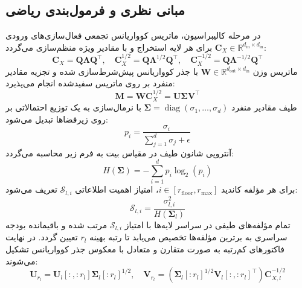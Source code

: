 \subsection{مبانی نظری و فرمول‌بندی ریاضی}
در مرحله کالیبراسیون، ماتریس کوواریانس تجمعی فعال‌سازی‌های ورودی $\mathbf{C}_X \in \mathbb{R}^{d_{\text{in}} \times d_{\text{in}}}$ برای هر لایه استخراج و با مقادیر ویژه منظم‌سازی می‌گردد:
\begin{equation}
\mathbf{C}_X = \mathbf{Q} \mathbf{\Lambda} \mathbf{Q}^\top, \quad \mathbf{C}_X^{1/2} = \mathbf{Q} \mathbf{\Lambda}^{1/2} \mathbf{Q}^\top, \quad \mathbf{C}_X^{-1/2} = \mathbf{Q} \mathbf{\Lambda}^{-1/2} \mathbf{Q}^\top
\end{equation}
ماتریس وزن $\mathbf{W} \in \mathbb{R}^{d_{\text{out}} \times d_{\text{in}}}$ با جذر کوواریانس پیش‌شرط‌سازی شده و تجزیه مقادیر منفرد بر روی ماتریس سفیدشده انجام می‌پذیرد:
\begin{equation}
\mathbf{M} = \mathbf{W} \mathbf{C}_X^{1/2} = \mathbf{U} \mathbf{\Sigma} \mathbf{V}^\top
\end{equation}
طیف مقادیر منفرد $\mathbf{\Sigma} = \operatorname{diag}(\sigma_1, \dots, \sigma_d)$ با نرمال‌سازی به یک توزیع احتمالاتی بر روی زیرفضاها تبدیل می‌شود:
\begin{equation}
p_i = \frac{\sigma_i}{\sum_{j=1}^d \sigma_j + \epsilon}
\end{equation}
آنتروپی شانون طیف در مقیاس بیت به فرم زیر محاسبه می‌گردد:
\begin{equation}
H(\mathbf{\Sigma}) = -\sum_{i=1}^d p_i \log_2(p_i)
\end{equation}
برای هر مؤلفه کاندید $i \in [r_{\text{floor}}, r_{\max}]$، امتیاز اهمیت اطلاعاتی $\mathcal{S}_{l, i}$ تعریف می‌شود:
\begin{equation}
\mathcal{S}_{l, i} = \frac{\sigma_{l, i}^2}{H(\mathbf{\Sigma}_l)}
\end{equation}
تمام مؤلفه‌های طیفی در سراسر لایه‌ها با امتیاز $\mathcal{S}_{l, i}$ مرتب شده و باقیمانده بودجه سراسری به برترین مؤلفه‌ها تخصیص می‌یابد تا رتبه بهینه $r_l$ تعیین گردد. در نهایت فاکتورهای کم‌رتبه به صورت متقارن و متعادل با معکوس جذر کوواریانس تشکیل می‌شوند:
\begin{equation}
\mathbf{U}_{r_l} = \mathbf{U}_l[:, :r_l] \mathbf{\Sigma}_l[:r_l]^{1/2}, \quad \mathbf{V}_{r_l} = (\mathbf{\Sigma}_l[:r_l]^{1/2} \mathbf{V}_l[:, :r_l]^\top) \mathbf{C}_{X, l}^{-1/2}
\end{equation}

